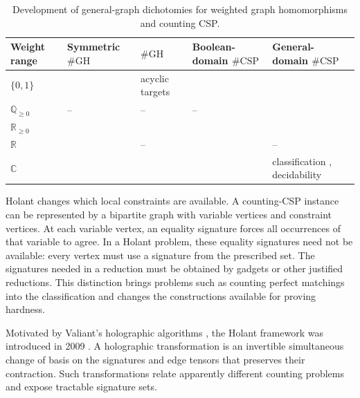 \documentclass[11pt,letterpaper,onecolumn]{article}
\theoremstyle{plain}
\theoremstyle{definition}
\theoremstyle{remark}
\begin{document}
	\begin{table}[!htbp]
		\centering
		\caption{Development of general-graph dichotomies for weighted graph
			homomorphisms and counting CSP.}
		\label{tab:intro-gh-csp-history}
		\small
		\setlength{\tabcolsep}{3.5pt}
		\renewcommand{\arraystretch}{1.16}
		\begin{tabularx}{\textwidth}{@{}l
				>{\raggedright\arraybackslash}X
				>{\raggedright\arraybackslash}X
				>{\raggedright\arraybackslash}X
				>{\raggedright\arraybackslash}X@{}}
			\toprule
			Weight range & Symmetric \(\#\mathrm{GH}\) & \(\#\mathrm{GH}\) &
			Boolean-domain \(\#\mathrm{CSP}\) &
			General-domain \(\#\mathrm{CSP}\) \\
			\midrule
			\(\{0,1\}\)
			& \cite{DyerGreenhill2000}
			& acyclic targets \cite{DyerGoldbergPaterson2007}
			& \cite{CreignouHermann1996}
			& \cite{Bulatov2013,DyerRicherby2013} \\
			\(\mathbb Q_{\ge0}\)
			& -- & -- & --
			& \cite{BulatovDyerGoldbergJalseniusJerrumRicherby2012} \\
			\(\mathbb R_{\ge0}\)
			& \cite{BulatovGrohe2005}
			& \cite{CaiChen2019}
			& \cite{DyerGoldbergJerrum2009}
			& \cite{CaiChenLu2016} \\
			\(\mathbb R\)
			& \cite{GoldbergGroheJerrumThurley2010}
			& --
			& \cite{BulatovDyerGoldbergJalseniusRicherby2009}
			& -- \\
			\(\mathbb C\)
			& \cite{CaiChenLu2013}
			& \cite{CaiChen2017}
			& \cite{CaiLuXia2014}
			& classification \cite{CaiChen2017},
			decidability \cite{LiuMeng2026CSPDecidability} \\
			\bottomrule
		\end{tabularx}
	\end{table}

Holant changes which local constraints are available.  A counting-CSP
instance can be represented by a bipartite graph with variable vertices
and constraint vertices.  At each variable vertex, an equality signature
forces all occurrences of that variable to agree.  In a Holant problem,
these equality signatures need not be available: every vertex must use a
signature from the prescribed set. The signatures needed in a reduction
must be obtained by gadgets or other justified reductions. This distinction brings
problems such as counting perfect matchings into the classification and
changes the constructions available for proving hardness.

Motivated by Valiant's holographic algorithms \cite{Valiant2008}, the
Holant framework was introduced in 2009 \cite{CaiLuXia2009}.
A holographic transformation is an invertible simultaneous change of basis
on the signatures and edge tensors that preserves their contraction.
Such transformations relate apparently different counting problems and
expose tractable signature sets.
\end{document}
